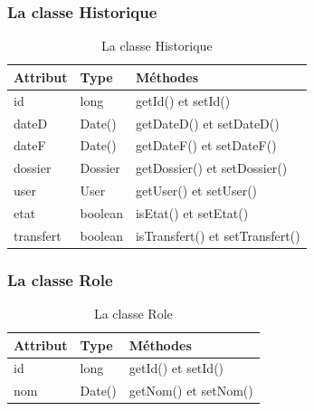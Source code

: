 \subsubsection{La classe Historique}
\begin{table}[H]
	\centering\setlength\tabcolsep{1cm}
	
	\begin{tabular}{|l|l|l|}
		\hline
		\textbf{Attribut}  & \textbf{Type} & \multicolumn{1}{l|}{\textbf{Méthodes}} \\ \hline
		
		id & long & getId() et setId()\\ \cline{1-2}
		dateD & Date() & getDateD() et setDateD()\\ \cline{1-2}
		
				dateF & Date() & getDateF() et setDateF()\\ \cline{1-2}
				
				dossier & Dossier & getDossier() et setDossier()\\ \cline{1-2}
				
					user & User & getUser() et setUser()\\ \cline{1-2}
					
					etat & boolean & isEtat() et setEtat()\\ \cline{1-2}
				transfert & boolean & isTransfert() et setTransfert()\\ \hline
	\end{tabular}
	\caption{La classe Historique}
\label{fig:class10}
\end{table}
 
   
   


\subsubsection{La classe Role}
\begin{table}[H]
	\centering\setlength\tabcolsep{1.2cm}
	
	\begin{tabular}{|l|l|l|}
		\hline
		\textbf{Attribut}  & \textbf{Type} & \multicolumn{1}{l|}{\textbf{Méthodes}} \\ \hline
		
		id & long & getId() et setId()\\ \cline{1-2}
		nom & Date() & getNom() et setNom()\\ \hline
	\end{tabular}	\caption{La classe Role}
	\label{fig:class7}
\end{table}

